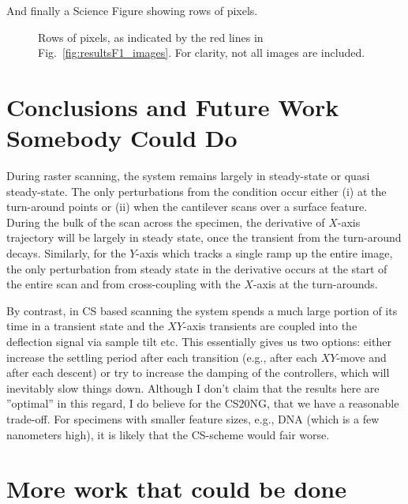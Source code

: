 \documentclass[11pt]{article}
\begin{document}
And finally a Science Figure showing rows of pixels.

\begin{figure}
    
    \caption{Rows of pixels, as indicated by the red lines in Fig.~\ref{fig:resultsF1_images}. For clarity, not all images are included.}  
    \label{fig: }
\end{figure}

\section{Conclusions and Future Work Somebody Could Do}

During raster scanning, the system remains largely in steady-state or quasi steady-state. The only perturbations from the condition occur either (i) at the turn-around points or (ii) when the cantilever scans over a surface feature. During the bulk of the scan across the specimen, the derivative of $X$-axis trajectory will be largely in steady state, once the transient from the turn-around decays. Similarly, for the $Y$-axis which tracks a single ramp up the entire image, the only perturbation from steady state in the derivative occurs at the start of the entire scan and from cross-coupling with the $X$-axis at the turn-arounds. 

By contrast, in CS based scanning the system spends a much large portion of its time in a transient state and the $XY$-axis transients are coupled into the deflection signal via sample tilt etc. This essentially gives us two options: either increase the settling period after each transition (e.g., after each $XY$-move and after each descent) or try to increase the damping of the controllers, which will inevitably slow things down.
Although I don't claim that the results here are ''optimal'' in this regard, I do believe for the CS20NG, that we have a reasonable trade-off. For specimens with smaller feature sizes, e.g., DNA (which is a few 
nanometers high), it is likely that the CS-scheme would fair worse. 


\section{More work that could be done}
\end{document}
